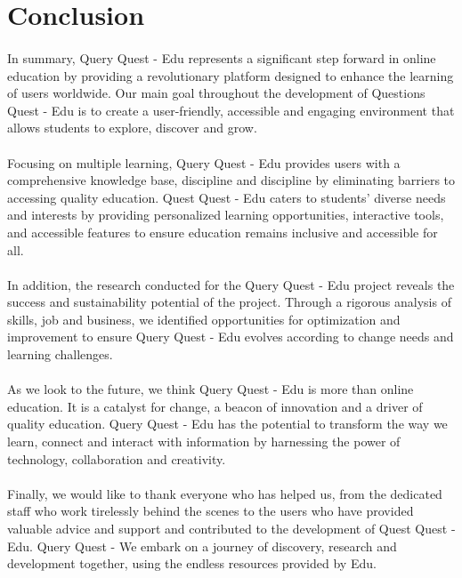 \section{Conclusion}
\paragraph{} In summary, Query Quest - Edu represents a significant step forward in online education by providing a revolutionary platform designed to enhance the learning of users worldwide. Our main goal throughout the development of Questions Quest - Edu is to create a user-friendly, accessible and engaging environment that allows students to explore, discover and grow.

\paragraph{} Focusing on multiple learning, Query Quest - Edu provides users with a comprehensive knowledge base, discipline and discipline by eliminating barriers to accessing quality education. Quest Quest - Edu caters to students' diverse needs and interests by providing personalized learning opportunities, interactive tools, and accessible features to ensure education remains inclusive and accessible for all.

\paragraph{} In addition, the research conducted for the Query Quest - Edu project reveals the success and sustainability potential of the project. Through a rigorous analysis of skills, job and business, we identified opportunities for optimization and improvement to ensure Query Quest - Edu evolves according to change needs and learning challenges.

\paragraph{} As we look to the future, we think Query Quest - Edu is more than online education. It is a catalyst for change, a beacon of innovation and a driver of quality education. Query Quest - Edu has the potential to transform the way we learn, connect and interact with information by harnessing the power of technology, collaboration and creativity.

\paragraph{} Finally, we would like to thank everyone who has helped us, from the dedicated staff who work tirelessly behind the scenes to the users who have provided valuable advice and support and contributed to the development of Quest Quest - Edu. Query Quest - We embark on a journey of discovery, research and development together, using the endless resources provided by Edu.